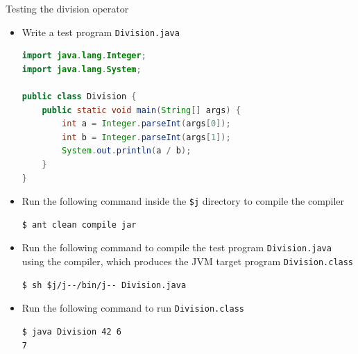 \documentclass[8pt,a4paper,compress]{beamer}
\begin{document}
\begin{frame}[fragile]
\pause

Testing the division operator
\begin{itemize}
\item Write a test \jmm program \lstinline{Division.java}
\begin{lstlisting}[language=Java]
import java.lang.Integer;
import java.lang.System;

public class Division {
    public static void main(String[] args) {
        int a = Integer.parseInt(args[0]);
        int b = Integer.parseInt(args[1]);
        System.out.println(a / b);
    }
}
\end{lstlisting}

\item Run the following command inside the \lstinline{$j} directory to compile the \jmm compiler

\begin{lstlisting}[language={}]
$ ant clean compile jar
\end{lstlisting}

\item Run the following command to compile the test program \lstinline{Division.java} using the \jmm compiler, which produces the JVM target program \lstinline{Division.class}

\begin{lstlisting}[language={}]
$ sh $j/j--/bin/j-- Division.java
\end{lstlisting}

\item Run the following command to run \lstinline{Division.class}

\begin{lstlisting}[language={}]
$ java Division 42 6
7
\end{lstlisting}
\end{itemize}
\end{frame}
\end{document}
